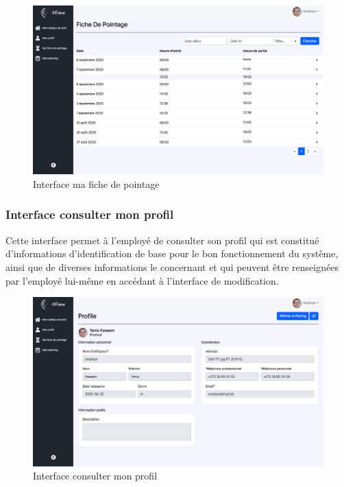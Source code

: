 \begin{figure}[h!]
    \vspace{-10pt}
    \centering
    \includegraphics[scale=0.306 ]{images/interface/fiche_pointage.png}
    \caption{Interface ma fiche de pointage}
    \label{fig93}
\end{figure}

\vspace{-10pt}   
\subsubsection*{Interface consulter mon profil}
Cette interface permet à l’employé de consulter son profil qui est constitué
d’informations d'identification de base pour le bon fonctionnement du système,
ainsi que de diverses informations le concernant et qui peuvent être renseignées
par l’employé lui-même en accédant à l’interface de modification.

\begin{figure}[h!]
    \centering
    \includegraphics[scale=0.306 ]{images/interface/mon_profil.png}
    \caption{Interface consulter mon profil}
    \label{fig94}
\end{figure}

